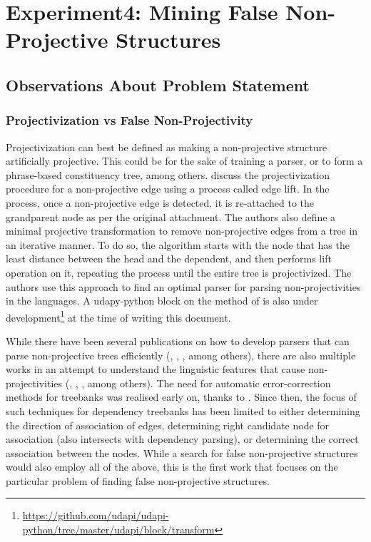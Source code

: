 \chapter{Experiment4: Mining False Non-Projective Structures}
\label{chap:nonproj}

\section{Observations About Problem Statement}
\subsection{Projectivization vs False Non-Projectivity}

Projectivization can best be defined as making a non-projective structure artificially projective. This could be for the sake of training a parser, or to form a phrase-based constituency tree, among others. \cite{nivre2005pseudo} discuss the projectivization procedure for a non-projective edge using a process called edge lift. In the process, once a non-projective edge is detected, it is re-attached to the grandparent node as per the original attachment. The authors also define a minimal projective transformation to remove non-projective edges from a tree in an iterative manner. To do so, the algorithm starts with the node that has the least distance between the head and the dependent, and then performs lift operation on it, repeating the process until the entire tree is projectivized. The authors use this approach to find an optimal parser for parsing non-projectivities in the languages. A udapy-python block on the method of \citeauthor{nivre2005pseudo} is also under development\footnote{\url{https://github.com/udapi/udapi-python/tree/master/udapi/block/transform}} at the time of writing this document.

While there have been several publications on how to develop parsers that can parse non-projective trees efficiently (\citep{npparser1}, \citep{npparser2}, \citep{npparser3}, among others), there are also multiple works in an attempt to understand the linguistic features that cause non-projectivities (\citep{mannem2009insights}, \citep{mambriniNonProj},
\citep{npprojvalency}, among others). The need for automatic error-correction methods for treebanks was realised early on, thanks to \cite{boyd}. Since then, the focus of such techniques for dependency treebanks has been limited to either determining the direction of association of edges, determining right candidate node for association (also intersects with dependency parsing), or determining the correct association between the nodes. While a search for false non-projective structures would also employ all of the above, this is the first work that focuses on the particular problem of finding false non-projective structures.

